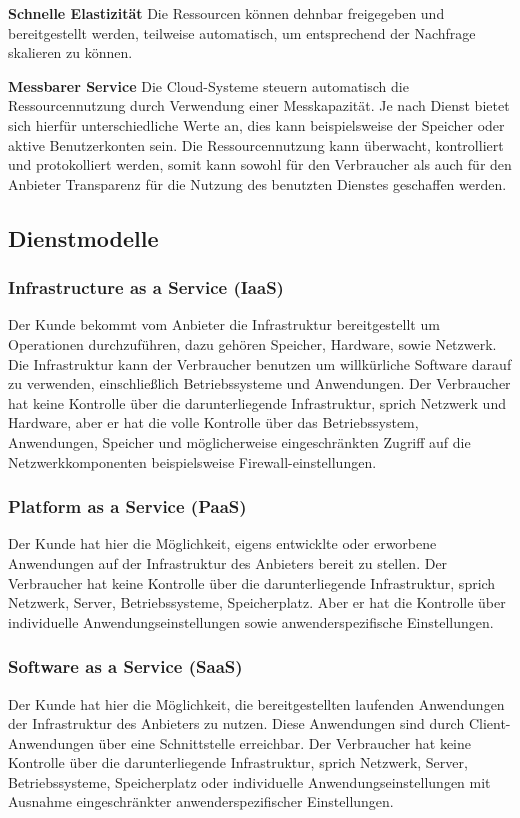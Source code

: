 \textbf{Schnelle Elastizität}
Die Ressourcen können dehnbar freigegeben und bereitgestellt werden, teilweise automatisch, um entsprechend der Nachfrage skalieren zu können\cite{nist_definition}.

\textbf{Messbarer Service}
Die Cloud-Systeme steuern automatisch die Ressourcennutzung durch Verwendung einer Messkapazität. Je nach Dienst bietet sich hierfür unterschiedliche Werte an, dies kann beispielsweise der Speicher oder aktive Benutzerkonten sein. Die Ressourcennutzung kann überwacht, kontrolliert und protokolliert werden, somit kann sowohl für den Verbraucher als auch für den Anbieter Transparenz für die Nutzung des benutzten Dienstes geschaffen werden\cite{nist_definition}.


\subsection{Dienstmodelle}
\subsubsection{Infrastructure as a Service (IaaS)} \label{IaaS}
Der Kunde bekommt vom Anbieter die Infrastruktur bereitgestellt um Operationen durchzuführen, dazu gehören Speicher, Hardware, sowie Netzwerk. Die Infrastruktur kann der Verbraucher benutzen um willkürliche Software darauf zu verwenden, einschließlich Betriebssysteme und Anwendungen. Der Verbraucher hat keine Kontrolle über die darunterliegende Infrastruktur, sprich Netzwerk und Hardware, aber er hat die volle Kontrolle über das Betriebssystem, Anwendungen, Speicher und möglicherweise eingeschränkten Zugriff auf die Netzwerkkomponenten beispielsweise Firewall-einstellungen\cite{nist_definition}.

\subsubsection{Platform as a Service (PaaS)} \label{PaaS} 
Der Kunde hat hier die Möglichkeit, eigens entwicklte oder erworbene Anwendungen auf der Infrastruktur des Anbieters bereit zu stellen. Der Verbraucher hat keine Kontrolle über die darunterliegende Infrastruktur, sprich Netzwerk, Server, Betriebssysteme, Speicherplatz. Aber er hat die Kontrolle über individuelle Anwendungseinstellungen sowie anwenderspezifische Einstellungen\cite{nist_definition}.

\subsubsection{Software as a Service (SaaS)} \label{SaaS}
Der Kunde hat hier die Möglichkeit, die bereitgestellten laufenden Anwendungen der Infrastruktur des Anbieters zu nutzen. Diese Anwendungen sind durch Client-Anwendungen über eine Schnittstelle erreichbar. Der Verbraucher hat keine Kontrolle über die darunterliegende Infrastruktur, sprich Netzwerk, Server, Betriebssysteme, Speicherplatz oder individuelle Anwendungseinstellungen mit Ausnahme eingeschränkter anwenderspezifischer Einstellungen\cite{nist_definition}.

